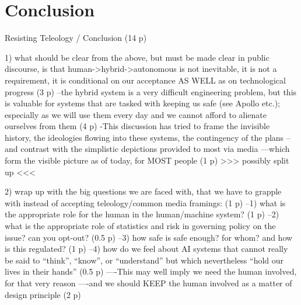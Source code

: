 \chapter{Conclusion}

Resisting Teleology / Conclusion (14 p)

1) what should be clear from the above, but must be made clear in
public discourse, is that human->hybrid->autonomous is not inevitable,
it is not a requirement, it is conditional on our acceptance AS WELL
as on technological progress (3 p)
--the hybrid system is a very difficult engineering problem, but this
is valuable for systems that are tasked with keeping us safe (see
Apollo etc.); especially as we will use them every day and we cannot
afford to alienate ourselves from them (4 p)
-This discussion has tried to frame the invisible history, the
ideologies flowing into these systems, the contingency of the plans
--and contrast with the simplistic depictions provided to most via
media
---which form the visible picture as of today, for MOST people (1 p)
>>> possibly split up <<<

2) wrap up with the big questions we are faced with, that we have to
grapple with instead of accepting teleology/common media framings: (1
p)
--1) what is the appropriate role for the human in the human/machine
system? (1 p)
--2) what is the appropriate role of statistics and risk in governing
policy on the issue? can you opt-out? (0.5 p)
--3) how safe is safe enough? for whom? and how is this regulated? (1
p)
--4) how do we feel about AI systems that cannot really be said to
``think'', ``know'', or ``understand'' but which nevertheless ``hold
our lives in their hands'' (0.5 p)
----This may well imply we need the human involved, for that very
reason
----and we should KEEP the human involved as a matter of design
principle (2 p)

